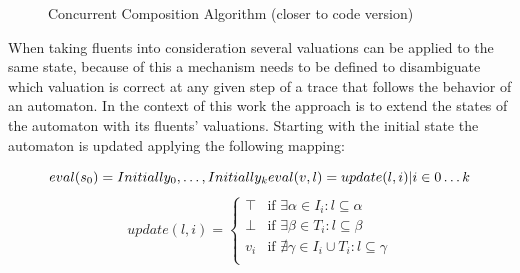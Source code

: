 \begin{figure}[ht]
	\begin{center}
		 
		\caption{Concurrent Composition Algorithm (closer to code version)}
		\label{fig:dfs-code2}
	\end{center}
\end{figure}

When taking fluents into consideration several valuations can be applied to the same state, because of this a mechanism needs to be defined to disambiguate which valuation is correct at any given step of a trace that follows the behavior of an automaton.
In the context of this work the approach is to extend the states of the automaton with its fluents' valuations. Starting with the initial state the automaton is updated applying the following mapping:

\[
eval(s_0) = {Initially_0,\ldots,Initially_k}\\
eval(v,l) = {update(l,i) | i \in 0\ldots k}
\]
\[
update(l,i)	=  \begin{cases}
\top & \text{if } \exists \alpha \in I_i: l \subseteq \alpha \\
\bot & \text{if } \exists \beta \in T_i: l \subseteq \beta \\
v_i & \text{if } \nexists \gamma \in I_i \cup T_i: l \subseteq \gamma \\
\end{cases}
\]